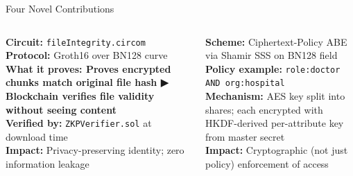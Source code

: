 \documentclass[aspectratio=169]{beamer}
\begin{document}
\begin{frame}{Four Novel Contributions}
\begin{columns}[T]
\begin{tcolorbox}[bluebox, title=\textbf{N1: Zero-Knowledge Proofs (ZKP)},
  height=5.8cm, valign=top]
\scriptsize
\textbf{Circuit:} \texttt{fileIntegrity.circom}\\
\textbf{Protocol:} Groth16 over BN128 curve\\[5pt]
\textbf{What it proves: Proves encrypted chunks match original file hash
▶ Blockchain verifies file validity without seeing content} \\[5pt]
\textbf{Verified by:} \texttt{ZKPVerifier.sol} at download time\\[5pt]
\textbf{Impact:} Privacy-preserving identity; zero information leakage
\end{tcolorbox}
\begin{tcolorbox}[greenbox, title=\textbf{N2: Attribute-Based Encryption (ABE)},
  height=5.8cm, valign=top]
\scriptsize
\textbf{Scheme:} Ciphertext-Policy ABE via Shamir SSS on BN128 field\\[5pt]
\textbf{Policy example:} \texttt{role:doctor AND org:hospital}\\[5pt]
\textbf{Mechanism:} AES key split into shares; each encrypted with
HKDF-derived per-attribute key from master secret\\[5pt]
\textbf{Impact:} Cryptographic (not just policy) enforcement of access
\end{tcolorbox}
\end{columns}
\end{frame}
\end{document}
